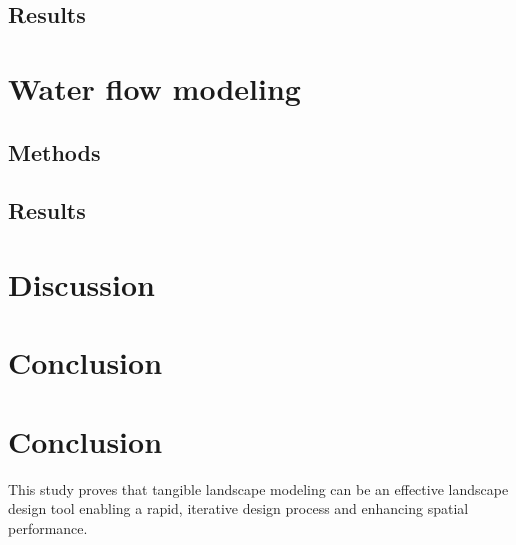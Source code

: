 \documentclass[Afour,sageh,times]{sagej}
\begin{document}
\subsection{Results}

\section{Water flow modeling}
\subsection{Methods}
\subsection{Results}

\section{Discussion}


\section{Conclusion}


\clearpage

\section{Conclusion}
This study proves that tangible landscape modeling
can be an effective landscape design tool
enabling a rapid, iterative design process and
enhancing spatial performance.


\end{document}
